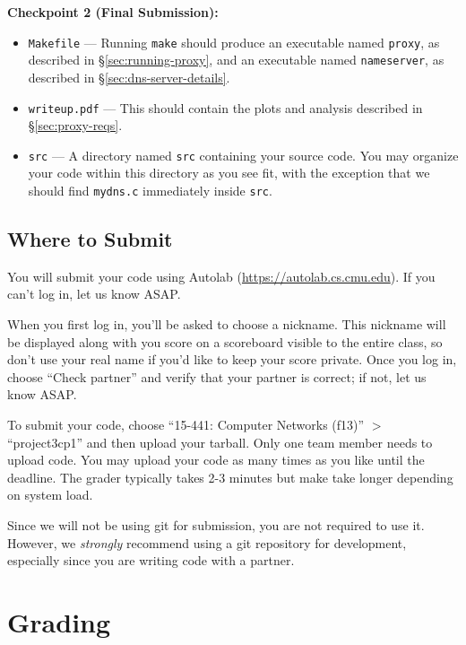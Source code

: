 \documentclass{article}
\begin{document}
\medskip \noindent \textbf{Checkpoint 2 (Final Submission):}
\begin{itemize}
	\item \texttt{Makefile} --- Running \texttt{make} should produce an
	executable named \texttt{proxy}, as described in \S\ref{sec:running-proxy},
	and an executable named \texttt{nameserver}, as described in
	\S\ref{sec:dns-server-details}.

	\item \texttt{writeup.pdf} --- This should contain the plots and analysis
	described in \S\ref{sec:proxy-reqs}. 

	\item \texttt{src} --- A directory named \texttt{src} containing your
	source code. You may organize your code within this directory as you see
	fit, with the exception that we should find \texttt{mydns.c} immediately
	inside \texttt{src}.
\end{itemize}


\subsection{Where to Submit}

You will submit your code using Autolab (\url{https://autolab.cs.cmu.edu}). If
you can't log in, let us know ASAP. 

When you first log in, you'll be asked to choose a nickname. This nickname will
be displayed along with you score on a scoreboard visible to the entire class,
so don't use your real name if you'd like to keep your score private. Once you
log in, choose ``Check partner'' and verify that your partner is correct; if
not, let us know ASAP.

To submit your code, choose ``15-441: Computer Networks (f13)'' $>$
``project3cp1'' and then upload your tarball. Only one team member needs to
upload code. You may upload your code as many times as you like until the
deadline. The grader typically takes 2-3 minutes but make take longer depending
on system load.

Since we will not be using git for submission, you are not required to use it.
However, we \emph{strongly} recommend using a git repository for development,
especially since you are writing code with a partner.


\section{Grading}
\end{document}
